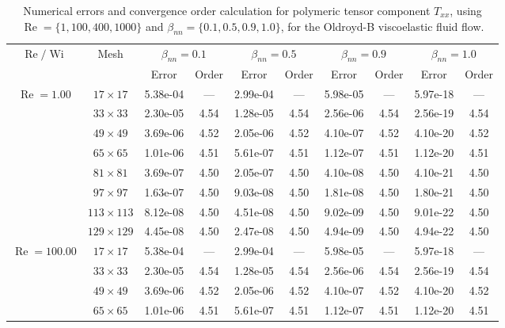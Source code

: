 \documentclass[preprint, 12pt]{elsarticle}
\begin{document}
\begin{center}
\begin{table}[H]
\caption{Numerical errors and convergence order calculation for polymeric tensor component $T_{xx}$, using $\operatorname{Re}=\{1,100,400,1000\}$ and $\beta_{nn}=\{0.1,0.5,0.9,1.0\}$, for the Oldroyd-B viscoelastic fluid flow.\label{Appendix_tab_OldroydBTxxWi5_10}}
\tiny{
    \begin{tabular*}{\textwidth}{@{\extracolsep\fill}cccccccccc@{}}
    \hline
    \multirow{2}{*}{$\operatorname{Re}/\operatorname{Wi}$} & \multirow{2}{*}{Mesh} & \multicolumn{2}{c}{$\beta_{nn}=0.1$}  & \multicolumn{2}{c}{$\beta_{nn}=0.5$}  & \multicolumn{2}{c}{$\beta_{nn}=0.9$}  & \multicolumn{2}{c}{$\beta_{nn}=1.0$}\\ %
     & & Error & Order & Error & Order & Error & Order & Error & Order \\
    \hline
    \multirow{7}{*}{$\operatorname{Re}=1.00$} & $17\times 17$ & 5.38e-04 & --- & 2.99e-04 & --- & 5.98e-05 & --- & 5.97e-18 & --- \\
    & $33\times 33$ & 2.30e-05 & 4.54 & 1.28e-05 & 4.54 & 2.56e-06 & 4.54 & 2.56e-19 & 4.54 \\
    & $49\times 49$ & 3.69e-06 & 4.52 & 2.05e-06 & 4.52 & 4.10e-07 & 4.52 & 4.10e-20 & 4.52 \\
    \multirow{3}{*}{$\operatorname{Wi}=5$} & $65\times 65$ & 1.01e-06 & 4.51 & 5.61e-07 & 4.51 & 1.12e-07 & 4.51 & 1.12e-20 & 4.51 \\
    & $81\times 81$ & 3.69e-07 & 4.50 & 2.05e-07 & 4.50 & 4.10e-08 & 4.50 & 4.10e-21 & 4.50 \\
    & $97\times 97$ & 1.63e-07 & 4.50 & 9.03e-08 & 4.50 & 1.81e-08 & 4.50 & 1.80e-21 & 4.50 \\
    & $113\times 113$ & 8.12e-08 & 4.50 & 4.51e-08 & 4.50 & 9.02e-09 & 4.50 & 9.01e-22 & 4.50 \\
    & $129\times 129$ & 4.45e-08 & 4.50 & 2.47e-08 & 4.50 & 4.94e-09 & 4.50 & 4.94e-22 & 4.50 \\
    \hline
    \multirow{7}{*}{$\operatorname{Re}=100.00$} & $17\times 17$ & 5.38e-04 & --- & 2.99e-04 & --- & 5.98e-05 & --- & 5.97e-18 & --- \\
    & $33\times 33$ & 2.30e-05 & 4.54 & 1.28e-05 & 4.54 & 2.56e-06 & 4.54 & 2.56e-19 & 4.54 \\
    & $49\times 49$ & 3.69e-06 & 4.52 & 2.05e-06 & 4.52 & 4.10e-07 & 4.52 & 4.10e-20 & 4.52 \\
    \multirow{3}{*}{$\operatorname{Wi}=5$} & $65\times 65$ & 1.01e-06 & 4.51 & 5.61e-07 & 4.51 & 1.12e-07 & 4.51 & 1.12e-20 & 4.51 \\

\end{tabular*}}
\end{table}
\end{center}
\end{document}
